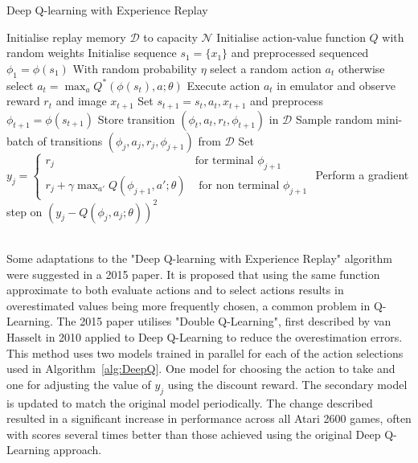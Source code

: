 \documentclass{article}
\begin{document}
\begin{algorithm}
\caption{Deep Q-learning with Experience Replay \cite{MnihPlayingLearning}}\label{alg:DeepQ}
\begin{algorithmic}
\State  Initialise replay  memory $\mathcal{D}$  to capacity $\mathcal{N}$
\State Initialise action-value function $Q$ with random weights
    \State Initialise sequence $s_1 = \{x_1\}$ and preprocessed sequenced $\phi_1 = \phi(s_1)$
        \State With random probability $\eta$ select a random action $a_t$
        \State otherwise select $a_t=\max_aQ^*(\phi(s_t),a;\theta)$
        \State Execute action $a_t$ in emulator and observe reward $r_t$ and image $x_{t+1}$
        \State Set $s_{t+1} = s_t,a_t,x_{t+1}$ and preprocess $\phi_{t+1} = \phi(s_{t+1})$
        \State Store transition $(\phi_t, a_t, r_t, \phi_{t+1})$ in $\mathcal{D}$
        \State Sample random mini-batch of transitions $(\phi_j, a_j, r_j, \phi_{j+1})$ from $\mathcal{D}$
        \State Set $y_j = \begin{cases}
                    r_j & \text{for terminal } \phi_{j+1}\\
                    r_j + \gamma \max_{a'}Q(\phi_{j+1},a';\theta) & \text{ for non terminal } \phi_{j+1}
                \end{cases}
                $
        \State Perform a gradient step on $(y_j - Q(\phi_j, a_j; \theta))^2$
    \EndFor
\EndFor
\end{algorithmic}
\end{algorithm}

\\

Some adaptations to the "Deep Q-learning with Experience Replay" algorithm were suggested in a 2015 paper\cite{vanHasselt2015DeepQ-learning}. It is proposed that using the same function approximate to both evaluate actions and to select actions results in overestimated values being more frequently chosen, a common problem in Q-Learning\cite{Thrun1993IssuesLearning}. The 2015 paper utilises "Double Q-Learning", first described by van Hasselt in 2010\cite{VanHasselt2010DoubleQ-learning} applied to Deep Q-Learning to reduce the overestimation errors. This method uses two models trained in parallel for each of the action selections used in Algorithm~\ref{alg:DeepQ}. One model for choosing the action to take and one for adjusting the value of $y_j$ using the discount reward. The secondary model is updated to match the original model periodically. 
The change described resulted in a significant increase in performance across all Atari 2600 games, often with scores several times better than those achieved using the original Deep Q-Learning approach. 
\end{document}
